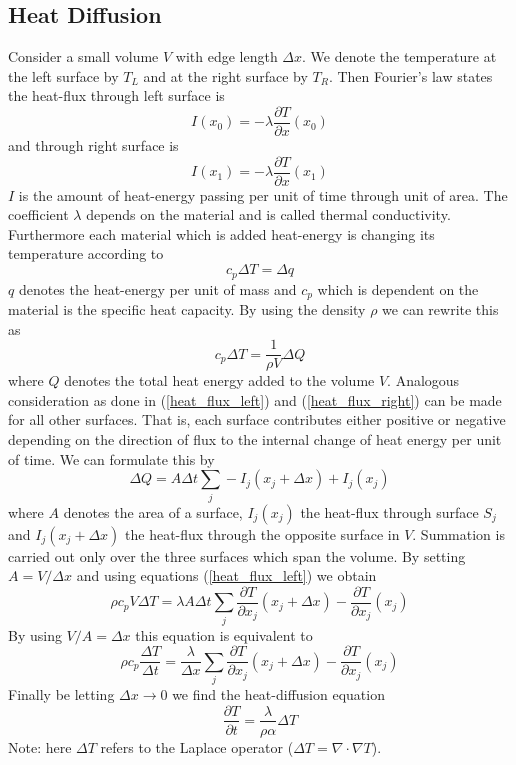 \documentclass[]{article}
\begin{document}
\subsection{Heat Diffusion}
Consider a small volume $V$ with edge length $\Delta x$. We denote the temperature at the left surface by $T_L$ and at the right surface by $T_R$. Then Fourier's law states the heat-flux through left surface is
\begin{equation} \label{heat_flux_left}
I(x_0)=-\lambda\frac{\partial T}{\partial x}(x_0)
\end{equation}
and through right surface is
\begin{equation} \label{heat_flux_right}
I(x_1)=-\lambda\frac{\partial T}{\partial x}(x_1)
\end{equation}
$I$ is the amount of heat-energy passing per unit of time through unit of area.
The coefficient $\lambda$ depends on the material and is called thermal conductivity.
Furthermore each material which is added heat-energy is changing its temperature according to
\begin{equation*}
c_p \Delta T=\Delta q
\end{equation*}
$q$ denotes the heat-energy per unit of mass and $c_p$ which is dependent on the material is the specific heat capacity. By using the density $\rho$ we can rewrite this as
\begin{equation} \label{specific_heat}
c_p \Delta T=\frac{1}{\rho V} \Delta Q
\end{equation}
where $Q$ denotes the total heat energy added to the volume $V$.
Analogous consideration as done in (\ref{heat_flux_left}) and (\ref{heat_flux_right}) can be made for all other surfaces. That is, each surface
contributes either positive or negative depending on the direction of flux to the internal change of heat energy per unit of time.
We can formulate this by
\begin{equation*}
\Delta Q = A\Delta t \sum_{j}-I_{j}(x_{j}+\Delta x)+I_{j}(x_{j})
\end{equation*}
where $A$ denotes the area of a surface, $I_{j}(x_j)$ the heat-flux through surface $S_j$
and $I_{j}(x_j+\Delta x)$ the heat-flux through the opposite surface in $V$. Summation is carried out only over the three surfaces which span the volume.
By setting $A=V/\Delta x$ and using equations (\ref{heat_flux_left}) we obtain
\begin{equation*}
\rho c_p V\Delta T = \lambda A\Delta t\sum_{j}\frac{\partial T}{\partial x_j}(x_j+\Delta x)-\frac{\partial T}{\partial x_j}(x_j)
\end{equation*}
By using $V/A=\Delta x$ this equation is equivalent to
\begin{equation*}
\rho c_p \frac{\Delta T}{\Delta t} = \frac{\lambda}{\Delta x}\sum_{j}\frac{\partial T}{\partial x_j}(x_j+\Delta x)-\frac{\partial T}{\partial x_j}(x_j)
\end{equation*}
Finally be letting $\Delta x\rightarrow 0$ we find the heat-diffusion equation
\begin{equation}
\frac{\partial T}{\partial t}=\frac{\lambda}{\rho\alpha}\Delta T
\end{equation}
Note: here $\Delta T$ refers to the Laplace operator ($\Delta T=\nabla\cdot\nabla T$).
\end{document}

